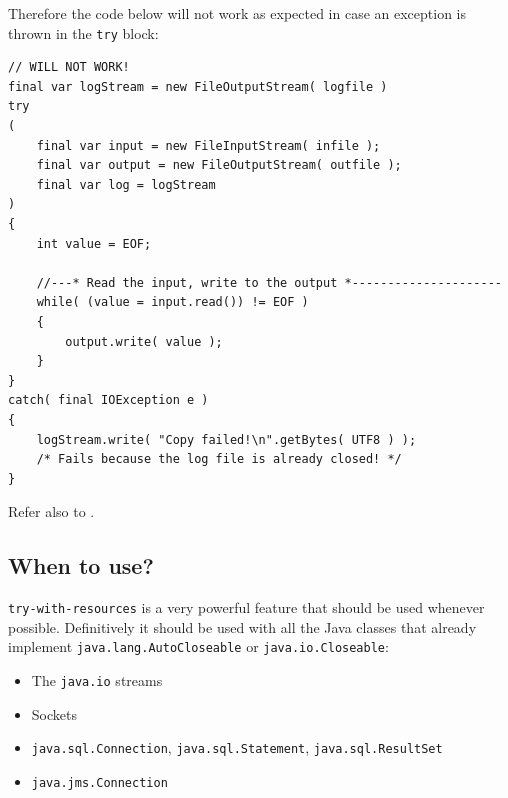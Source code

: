 \documentclass[11pt,a4paper, titlepage, parskip=half, headsepline, footsepline, cleardoublepage=current, headheight=1cm]{scrbook}
\begin{document}
Therefore the code below will not work as expected in case an exception is thrown in the \lstinline|try| block:
\begin{lstlisting}
// WILL NOT WORK!
final var logStream = new FileOutputStream( logfile )
try
(   
    final var input = new FileInputStream( infile );
    final var output = new FileOutputStream( outfile );
    final var log = logStream 
)
{
	int value = EOF;
	
    //---* Read the input, write to the output *---------------------
    while( (value = input.read()) != EOF )
    {
        output.write( value );
    }
}
catch( final IOException e )
{
    logStream.write( "Copy failed!\n".getBytes( UTF8 ) );
    /* Fails because the log file is already closed! */
}
\end{lstlisting}

Refer also to \autocite{ORACLE_DOC_LANGUAGE_SPECIFICATION:ExtendedTryWithResources}.

\subsection{When to use?}
\lstinline|try-with-resources| is a very powerful feature that should be used whenever possible. Definitively it should be used with all the Java classes that already implement \lstinline|java.lang.AutoCloseable| or \lstinline|java.io.Closeable|:

\begin{itemize}
\item{The \lstinline|java.io| streams}
\item{Sockets}
\item{\lstinline|java.sql.Connection|, \lstinline|java.sql.Statement|, \lstinline|java.sql.ResultSet|}
\item{\lstinline|java.jms.Connection|}
\end{itemize}
\end{document}
